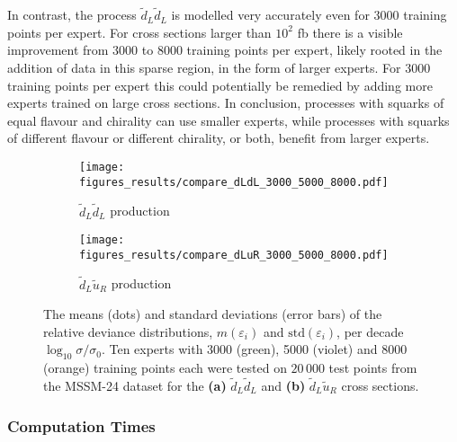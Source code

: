 \documentclass[twoside,english]{uiofysmaster}
\begin{document}
{{In contrast, the process $\widetilde{d}_L \widetilde{d}_L$ is modelled very accurately even for 3000 training points per expert. For cross sections larger than $10^2$ fb there is a visible improvement from 3000 to 8000 training points per expert, likely rooted in the addition of data in this sparse region, in the form of larger experts. For 3000 training points per expert this could potentially be remedied by adding more experts trained on large cross sections. In conclusion, processes with squarks of equal flavour and chirality can use smaller experts, while processes with squarks of different flavour or different chirality, or both, benefit from larger experts.

\begin{figure}
    \centering
    \begin{subfigure}[b]{0.9\textwidth}
        \texttt{[image: figures\_results/compare\_dLdL\_3000\_5000\_8000.pdf]}
        \caption{$\widetilde{d}_L \widetilde{d}_L$ production}
        \label{Fig:: results : RD MSSM-24 uLuL experts}
    \end{subfigure}
    \begin{subfigure}[b]{0.9\textwidth}
        \texttt{[image: figures\_results/compare\_dLuR\_3000\_5000\_8000.pdf]}
        \caption{$\widetilde{d}_L\widetilde{u}_R$ production}
        \label{Fig :: results : RD MSSM-24 uLdL experts}
    \end{subfigure}
    \caption[Relative deviance distributions varying optimal DGP size]{The means (dots) and standard deviations (error bars) of the relative deviance distributions, $m(\varepsilon_i)$ and $\mathrm{std}(\varepsilon_i)$, per decade $\log_{10} \sigma / \sigma_0$. Ten experts with 3000 (green), 5000 (violet) and 8000 (orange) training points each were tested on $20\,000$ test points from the MSSM-24 dataset for the \textbf{(a)}  $\widetilde{d}_L \widetilde{d}_L$ and \textbf{(b)} $\widetilde{d}_L\widetilde{u}_R$ cross sections. }
\label{Fig:: results : RD 3000 vs 5000}
\end{figure}


\subsubsection{Computation Times}


}}
\end{document}
